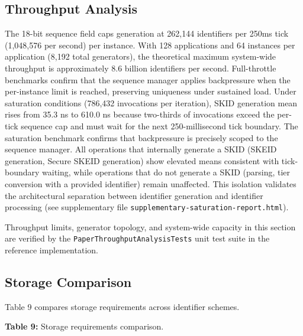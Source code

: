 \documentclass[fleqn,10pt,lineno]{wlpeerj}
\begin{document}
\subsection{Throughput Analysis}\label{throughput-analysis}

The 18-bit sequence field caps generation at 262,144 identifiers per
250ms tick (1,048,576 per second) per instance. With 128 applications
and 64 instances per application (8,192 total generators), the
theoretical maximum system-wide throughput is approximately 8.6 billion
identifiers per second. Full-throttle benchmarks confirm that the
sequence manager applies backpressure when the per-instance limit is
reached, preserving uniqueness under sustained load. Under saturation
conditions (786,432 invocations per iteration), SKID generation mean
rises from 35.3 ns to 610.0 ns because two-thirds of invocations exceed
the per-tick sequence cap and must wait for the next 250-millisecond
tick boundary. The saturation benchmark confirms that backpressure is
precisely scoped to the sequence manager. All operations that internally
generate a SKID (SKEID generation, Secure SKEID generation) show
elevated means consistent with tick-boundary waiting, while operations
that do not generate a SKID (parsing, tier conversion with a provided
identifier) remain unaffected. This isolation validates the
architectural separation between identifier generation and identifier
processing (see supplementary file
\texttt{supplementary-saturation-report.html}).

Throughput limits, generator topology, and system-wide capacity in this
section are verified by the \texttt{PaperThroughputAnalysisTests} unit
test suite in the reference implementation.

\subsection{Storage Comparison}\label{storage-comparison}

Table 9 compares storage requirements across identifier schemes.

\textbf{Table 9:} Storage requirements comparison.
\end{document}

